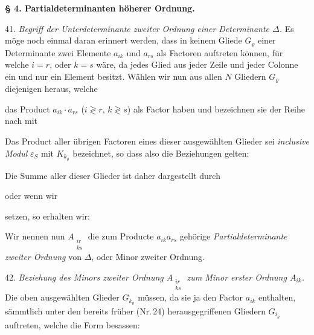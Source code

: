 \begin{center}
\textbf{§ 4. Partialdeterminanten höherer Ordnung.}
\end{center}

41. \textit{Begriff der Unterdeterminante zweiter Ordnung einer Determinante $\Delta$.} Es möge noch einmal daran erinnert werden, dass in keinem Gliede $G_\varrho$ einer Determinante zwei Elemente $a_{ik}$ und $a_{rs}$ als Factoren auftreten können, für welche $i=r$, oder $k=s$ wäre, da jedes Glied aus jeder Zeile und jeder Colonne ein und nur ein Element besitzt. Wählen wir nun aus allen $N$ Gliedern $G_\varrho$ diejenigen heraus, welche


das Product $a_{ik}\cdot a_{rs}$ ($i\gtrless r$, $k\gtrless s$) als Factor haben und bezeichnen sie der Reihe nach mit


Das Product aller übrigen Factoren eines dieser ausgewählten Glieder sei \textit{inclusive Modul} $\varepsilon_S$ mit $K_{k_\varrho}$ bezeichnet, so dass also die Beziehungen gelten:


Die Summe aller dieser Glieder ist daher dargestellt durch


oder wenn wir


setzen, so erhalten wir:


Wir nennen nun $A_{\substack{ir\\ks}}$ die zum Producte $a_{ik}a_{rs}$ gehörige \textit{Partialdeterminante zweiter Ordnung} von $\Delta$, oder Minor zweiter Ordnung.

42. \textit{Beziehung des Minors zweiter Ordnung $A_{\substack{ir\\ks}}$ zum Minor erster Ordnung $A_{ik}$.} Die oben ausgewählten Glieder $G_{k_\varrho}$ müssen, da sie ja den Factor $a_{ik}$ enthalten, sämmtlich unter den bereits früher (Nr.\,24) herausgegriffenen Gliedern $G_{i_\varrho}$ auftreten, welche die Form besassen:

